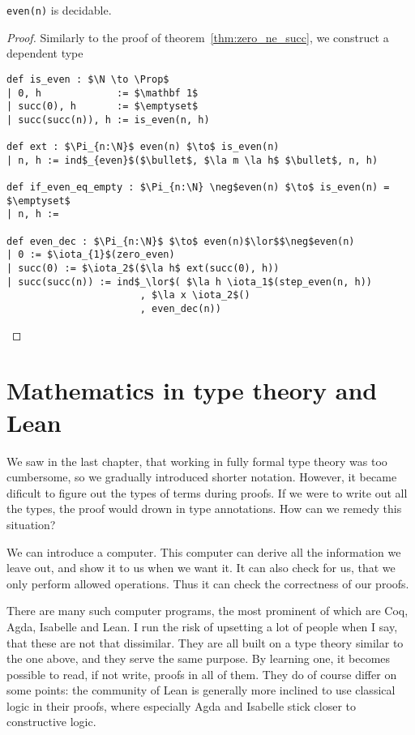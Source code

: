 \documentclass[a4paper, 12pt]{article}
\newcommand{\N}{\mathbb{N}}
\newcommand{\Prop}{\mathit{Prop}}
\renewcommand{\Prop}{\mathit{Prop}}
\newcommand{\la}[1]{\lambda{#1}.\,}
\theoremstyle{changedot}
\theoremstyle{changedotbreak}
\theoremstyle{nonumberplain}
\newtheorem{proof}{Proof}
\begin{document}
\begin{theorem}
  \lstinline{even(n)} is decidable.
\end{theorem}
\begin{proof}
  Similarly to the proof of theorem~\ref{thm:zero_ne_succ}, we construct a dependent type
\begin{lstlisting}
def is_even : $\N \to \Prop$
| 0, h             := $\mathbf 1$
| succ(0), h       := $\emptyset$
| succ(succ(n)), h := is_even(n, h)

def ext : $\Pi_{n:\N}$ even(n) $\to$ is_even(n)
| n, h := ind$_{even}$($\bullet$, $\la m \la h$ $\bullet$, n, h)

def if_even_eq_empty : $\Pi_{n:\N} \neg$even(n) $\to$ is_even(n) = $\emptyset$
| n, h := 

def even_dec : $\Pi_{n:\N}$ $\to$ even(n)$\lor$$\neg$even(n)
| 0 := $\iota_{1}$(zero_even)
| succ(0) := $\iota_2$($\la h$ ext(succ(0), h))
| succ(succ(n)) := ind$_\lor$( $\la h \iota_1$(step_even(n, h))
                       , $\la x \iota_2$()
                       , even_dec(n))
\end{lstlisting}
\end{proof}





\section{Mathematics in type theory and Lean}
We saw in the last chapter, that working in fully formal type theory was too cumbersome, so we gradually introduced shorter notation. However, it became dificult to figure out the types of terms during proofs. If we were to write out all the types, the proof would drown in type annotations. How can we remedy this situation?

We can introduce a computer. This computer can derive all the information we leave out, and show it to us when we want it. It can also check for us, that we only perform allowed operations. Thus it can check the correctness of our proofs.

There are many such computer programs, the most prominent of which are Coq, Agda, Isabelle and Lean. I run the risk of upsetting a lot of people when I say, that these are not that dissimilar. They are all built on a type theory similar to the one above, and they serve the same purpose. By learning one, it becomes possible to read, if not write, proofs in all of them. They do of course differ on some points: the community of Lean is generally more inclined to use classical logic in their proofs, where especially Agda and Isabelle stick closer to constructive logic.
\end{document}
